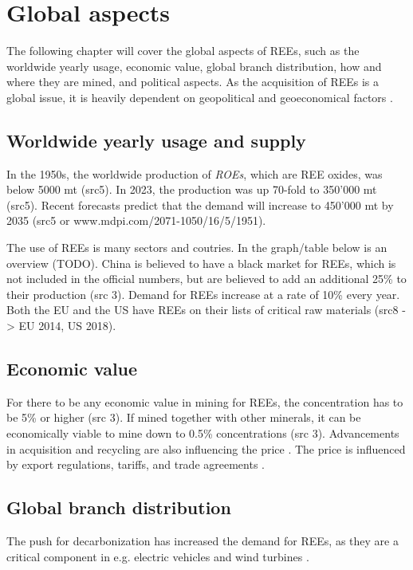 
\section{Global aspects}

The following chapter will cover the global aspects of REEs, such as the worldwide yearly usage, economic value, global branch distribution, how and where they are mined, and political aspects. As the acquisition of REEs is a global issue, it is heavily dependent on geopolitical and geoeconomical factors \cite{politics2022}.

\subsection{Worldwide yearly usage and supply}

In the 1950s, the worldwide production of \textit{ROEs}, which are REE oxides, was below 5000 mt (src5). In 2023, the production was up 70-fold to 350'000 mt (src5). Recent forecasts predict that the demand will increase to 450'000 mt by 2035 (src5 or www.mdpi.com/2071-1050/16/5/1951).

The use of REEs is many sectors and coutries. In the graph/table below is an overview (TODO). China is believed to have a black market for REEs, which is not included in the official numbers, but are believed to add an additional 25\% to their production (src 3). Demand for REEs increase at a rate of 10\% every year. Both the EU and the US have REEs on their lists of critical raw materials (src8 -> EU 2014, US 2018).

\subsection{Economic value}

For there to be any economic value in mining for REEs, the concentration has to be 5\% or higher (src 3). If mined together with other minerals, it can be economically viable to mine down to 0.5\% concentrations (src 3). Advancements in acquisition and recycling are also influencing the price \cite{REELandscape}. The price is influenced by export regulations, tariffs, and trade agreements \cite{politics2022}.

\subsection{Global branch distribution}

The push for decarbonization has increased the demand for REEs, as they are a critical component in e.g. electric vehicles and wind turbines \cite{windturbines2022}.

